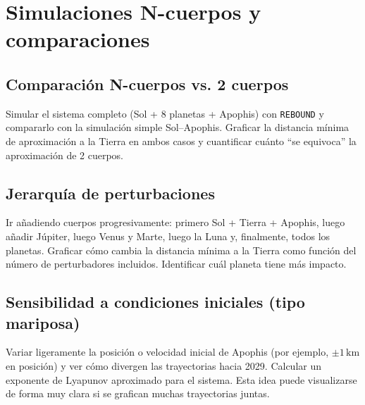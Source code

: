 \section{Simulaciones N-cuerpos y comparaciones}

\subsection{Comparación N-cuerpos vs. 2 cuerpos}

Simular el sistema completo (Sol + 8 planetas + Apophis) con \texttt{REBOUND} y compararlo con la simulación simple Sol--Apophis. Graficar la distancia mínima de aproximación a la Tierra en ambos casos y cuantificar cuánto ``se equivoca'' la aproximación de 2 cuerpos.

\subsection{Jerarquía de perturbaciones}

Ir añadiendo cuerpos progresivamente: primero Sol + Tierra + Apophis, luego añadir Júpiter, luego Venus y Marte, luego la Luna y, finalmente, todos los planetas. Graficar cómo cambia la distancia mínima a la Tierra como función del número de perturbadores incluidos. Identificar cuál planeta tiene más impacto.

\subsection{Sensibilidad a condiciones iniciales (tipo mariposa)}

Variar ligeramente la posición o velocidad inicial de Apophis (por ejemplo, $\pm 1\,\mathrm{km}$ en posición) y ver cómo divergen las trayectorias hacia 2029. Calcular un exponente de Lyapunov aproximado para el sistema. Esta idea puede visualizarse de forma muy clara si se grafican muchas trayectorias juntas.